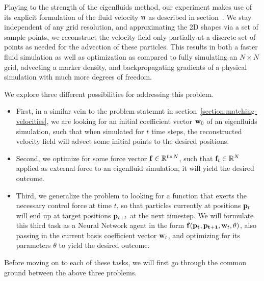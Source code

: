 Playing to the strength of the eigenfluids method, our experiment makes use of
its explicit formulation of the fluid velocity $\vb{u}$ as described in
section~. We stay independent of any grid resolution, and
approximating the 2D shapes via a set of sample points, we reconstruct the
velocity field only partially at a discrete set of points as needed for the
advection of these particles. This results in both a faster fluid simulation as
well as optimization as compared to fully simulating an $N\times N$ grid,
advecting a marker density, and backpropagating gradients of a physical
simulation with much more degrees of freedom.

We explore three different possibilities for addressing this problem. 
\begin{itemize}
  \item First, in a similar vein to the problem statemnt in
    section~\ref{section:matching-velocities}, we are looking for an initial
    coefficient vector $\vb{w}_0$ of an eigenfluids simulation, such that when
    simulated for $t$ time steps, the reconstructed velocity field will advect
    some initial points to the desired positions.
  \item Second, we optimize for some force vector $\vb{f}\in \mathbb{R}^{t\times
    N}$, such that $\vb{f}_t \in \mathbb{R}^N$ applied as external force to an
    eigenfluid simulation, it will yield the desired outcome.
  \item Third, we generalize the problem to looking for a function that exerts
    the necessary control force at time $t$, so that particles currently at
    positions $\vb{p}_t$ will end up at target positions $\vb{p}_{t+t}$ at the
    next timestep. We will formulate this third task as a \acf{Neural Network}
    agent in the form $\vb{f}(\vb{p_t}, \vb{p_{t+1}}, \vb{w}_{t}, \vb{\theta})$,
    also passing in the current basis coefficient vector $\vb{w}_t$, and
    optimizing for its parameters $\theta$ to yield the desired outcome.
\end{itemize}

Before moving on to each of these tasks, we will first go through the common
ground between the above three problems.


